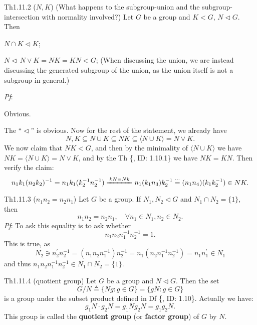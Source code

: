 \documentclass{article}
\newcommand{\nles}{\vartriangleleft}
\begin{document}
\begin{Th}{Th1.11.2 ($N, K$) (What happens to the subgroup-union and the subgroup-intersection with normality involved?)}
    Let $G$ be a group and $K<G$, $N\nles G$. Then
    \begin{compactenum}
        \item $N\cap K \nles K$;
        \item $N\nles\, N\vee K = NK = KN < G$; (When discussing the union, we are instead discussing the generated subgroup of the union, as the union itself is not a subgroup in general.)
    \end{compactenum}
    \tcblower
    \textit{Pf}: 
    \begin{compactenum}
        \item Obvious.
        \item The ``$\nles$'' is obvious. Now for the rest of the statement, we already have
        $$ N, K \subseteq N\cup K \subseteq NK \subseteq \langle N\cup K\rangle = N\vee K. $$
        We now claim that $NK < G$, and then by the minimality of $\langle N\cup K\rangle$ we have $NK = \langle N\cup K\rangle = N\vee K$, and by the Th \{, ID: 1.10.1\} we have $NK = KN$. Then verify the claim:
        $$ n_1k_1(n_2k_2)^{-1} = n_1k_1(k_2^{-1}n_2^{-1}) \xlongequal[]{kN = Nk} n_1(k_1n_3)k_2^{-1} \overset{\cdots}{=} (n_1n_4)(k_1k_2^{-1}) \in NK. $$ 
    \end{compactenum}
\end{Th}

\begin{Th}{Th1.11.3 ($n_1n_2 = n_2n_1$)}
    Let $G$ be a group. If $N_1, N_2\nles G$ and $N_1\cap N_2 = \{1\}$, then
    $$ n_1n_2 = n_2n_1, \quad \forall n_1\in N_1, n_2\in N_2. $$
    \tcblower
    \textit{Pf}: To ask this equality is to ask whether
    $$ n_1n_2n_1^{-1}n_2^{-1} = 1. $$
    This is true, as
    $$ N_2 \ni n_2^\prime n_2^{-1} = (n_1n_2n_1^{-1})n_2^{-1} = n_1(n_2n_1^{-1}n_2^{-1}) = n_1n_1^\prime \in N_1 $$
    and thus $n_1n_2n_1^{-1}n_2^{-1} \in N_1\cap N_2 = \{1\}$.
\end{Th}

\begin{Df}{Th1.11.4 (quotient group)}
    Let $G$ be a group and $N\nles G$. \textcolor{Th}{Then the set
    $$ G/N \triangleq \{Ng: g\in G\} = \{gN: g\in G\} $$
    is a group under the subset product defined in Df \{, ID: 1.10\}. Actually we have:
    $$ g_1N\cdot g_2N = g_1Ng_2N = g_1g_2N. $$}
    This group is called the \textbf{quotient group} (or \textbf{factor group}) of $G$ by $N$.
\end{Df}
\end{document}
